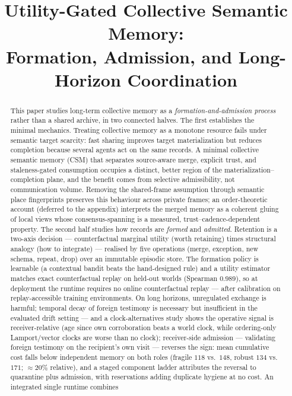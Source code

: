 \documentclass{article}
\title{Utility-Gated Collective Semantic Memory:\\Formation, Admission, and Long-Horizon Coordination}
\begin{document}
\maketitle
\begin{abstract}
This paper studies long-term collective memory as a
\emph{formation-and-admission process} rather than a shared archive,
in two connected halves. The first establishes the minimal mechanics.
Treating collective memory as a monotone resource fails under semantic
target scarcity: fast sharing improves target materialization but
reduces completion because several agents act on the same records. A
minimal collective semantic memory (CSM) that separates source-aware
merge, explicit trust, and staleness-gated consumption occupies a
distinct, better region of the materialization--completion plane, and
the benefit comes from selective admissibility, not communication
volume. Removing the shared-frame assumption through semantic place
fingerprints preserves this behaviour across private frames; an
order-theoretic account (deferred to the appendix) interprets the
merged memory as a coherent gluing of local views whose
consensus-spanning is a measured, trust--cadence-dependent property. The second half studies how records
are \emph{formed} and \emph{admitted}. Retention is a two-axis decision
--- counterfactual marginal utility (worth retaining) times structural
analogy (how to integrate) --- realised by five operations (merge,
exception, new schema, repeat, drop) over an immutable episodic store.
The formation policy is learnable (a contextual bandit beats the
hand-designed rule) and a utility estimator matches exact
counterfactual replay on held-out worlds (Spearman $0.989$), so at
deployment the runtime requires no online counterfactual replay ---
after calibration on replay-accessible training environments. On long
horizons, unregulated exchange is harmful; temporal decay of foreign
testimony is necessary but insufficient in the evaluated drift setting
--- and a clock-alternatives study shows the operative signal is
receiver-relative (age since own corroboration beats a world clock,
while ordering-only Lamport/vector clocks are worse than no clock);
receiver-side admission --- validating foreign testimony on the
recipient's own visit --- reverses the sign: mean cumulative cost
falls below independent memory on both roles (fragile $118$ vs.\
$148$, robust $134$ vs.\ $171$; ${\approx}20\%$ relative), and a
staged component ladder attributes the reversal to quarantine plus
admission, with reservations adding duplicate hygiene at no cost. An integrated single runtime combines

\end{abstract}
\end{document}
